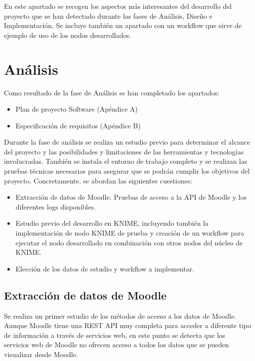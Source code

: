 
En este apartado se recogen los aspectos más interesantes del desarrollo del proyecto que se han detectado 
durante las fases de Análisis, Diseño e Implementación. Se incluye también un apartado con un workflow que sirve
de ejemplo de uso de los nodos desarrollados. 

\section{Análisis}

Como resultado de la fase de Análisis se han completado los apartados: 

\begin{itemize}
	\item Plan de proyecto Software (Apéndice A)
	\item Especificación de requisitos (Apéndice B)
\end{itemize}

Durante la fase de análisis se realiza un estudio previo para determinar el alcance del proyecto y 
las posibilidades y limitaciones de las herramientas y tecnologías involucradas. También se instala el entorno
de trabajo completo y se realizan las pruebas técnicas necesarias para asegurar que se podrán cumplir los objetivos
del proyecto. Concretamente, se abordan las siguientes cuestiones: 

\begin{itemize}
	\item Extracción de datos de Moodle. Pruebas de acceso a la API de Moodle y los diferentes logs disponibles. 
    \item Estudio previo del desarrollo en KNIME, incluyendo también la implementación de nodo KNIME de prueba y
	 creación de un workflow para ejecutar el nodo desarrollado en combinación con otros nodos del núcleo de KNIME.
	\item Elección de los datos de estudio y workflow a implementar.  
\end{itemize}


\subsection{Extracción de datos de Moodle}

Se realiza un primer estudio de los métodos de acceso a los datos de Moodle. Aunque Moodle tiene una REST API muy completa para acceder a diferente tipo de información a través de servicios 
web, en este punto se detecta que los servicios web de Moodle no ofrecen acceso a todos los
datos que se pueden visualizar desde Moodle. 
\

